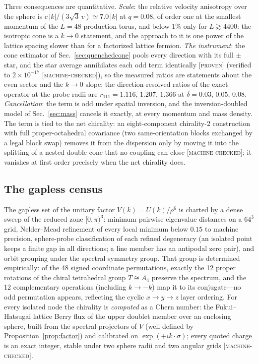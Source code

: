 \documentclass[aps,prd,twocolumn,superscriptaddress,nofootinbib,floatfix]{revtex4-2}
\newcommand{\evP}{\textnormal{\textsc{[proven]}}}
\newcommand{\evM}{\textnormal{\textsc{[machine-checked]}}}
\begin{document}
Three consequences are quantitative. \emph{Scale}: the relative
velocity anisotropy over the sphere is
$c\,|k|/(3\sqrt3\,v)\simeq7.0\,|k|$ at $q=0.08$, of order one at the
smallest momentum of the $L=48$ production torus, and below $1\%$ only
for $L\gtrsim4400$: the isotropic cone is a $k\to0$ statement, and the
approach to it is one power of the lattice spacing slower than for a
factorized lattice fermion. \emph{The instrument}: the cone estimator
of Sec.~\ref{sec:quenchedcone} pools every direction with its full
$\pm$ star, and the star average annihilates each odd term identically
\evP{} (verified to $2\times10^{-17}$ \evM{}), so the measured ratios
are statements about the even sector and the $k\to0$ slope; the
direction-resolved ratios of the exact operator at the probe radii are
$r_{111}=1.116,\,1.207,\,1.366$ at $\delta=0.03,\,0.05,\,0.08$.
\emph{Cancellation}: the term is odd under spatial inversion, and the
inversion-doubled model of Sec.~\ref{sec:mass} cancels it exactly, at
every momentum and mass density. The term is tied to the net
chirality: an eight-component chirality-2
construction with full proper-octahedral covariance (two
same-orientation blocks exchanged by a legal block swap) removes it
from the dispersion only by moving it into the splitting of a nested
double cone that no coupling can close \evM{}; it vanishes at first
order precisely when the net chirality does.

\subsection{The gapless census}
\label{sec:census}

The gapless set of the unitary factor $V(k)=U(k)/\rho^6$ is charted by
a dense sweep of the reduced zone $[0,\pi)^3$: minimum pairwise
eigenvalue distances on a $64^3$ grid, Nelder--Mead refinement of every
local minimum below $0.15$ to machine precision, sphere-probe
classification of each refined degeneracy (an isolated point keeps a
finite gap in all directions; a line member has an antipodal zero
pair), and orbit grouping under the spectral symmetry group. That group
is determined empirically: of the 48 signed coordinate permutations,
exactly the 12 proper rotations of the chiral tetrahedral group
$T\cong A_4$ preserve the spectrum, and the 12 complementary operations
(including $k\to-k$) map it to its conjugate---no odd permutation
appears, reflecting the cyclic $x\to y\to z$ layer ordering. For every
isolated node the chirality is \emph{computed} as a Chern number: the
Fukui--Hatsugai lattice Berry flux of the upper doublet member over an
enclosing sphere, built from the spectral projectors of $V$ (well
defined by Proposition~\ref{prop:factor}) and calibrated on
$\exp(+ik\cdot\sigma)$; every quoted charge is an exact integer, stable
under two sphere radii and two angular grids \evM{}.
\end{document}
